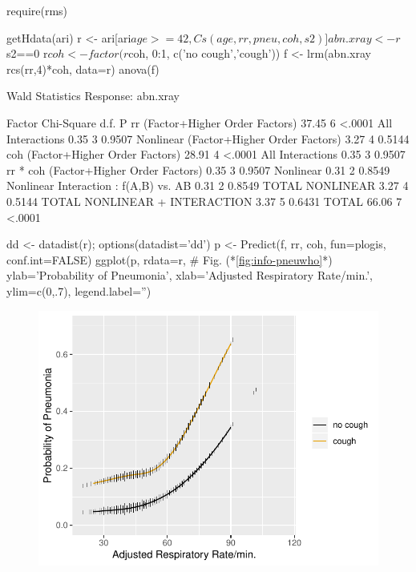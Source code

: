 \begin{Schunk}
\begin{Sinput}
require(rms)
\end{Sinput}
\begin{Sinput}
getHdata(ari)
r <- ari[ari$age >= 42, Cs(age, rr, pneu, coh, s2)]
abn.xray <- r$s2==0
r$coh <- factor(r$coh, 0:1, c('no cough','cough'))
f <- lrm(abn.xray ~ rcs(rr,4)*coh, data=r)
anova(f)
\end{Sinput}
\begin{Soutput}
                Wald Statistics          Response: abn.xray 

 Factor                                   Chi-Square d.f. P     
 rr  (Factor+Higher Order Factors)        37.45      6    <.0001
  All Interactions                         0.35      3    0.9507
  Nonlinear (Factor+Higher Order Factors)  3.27      4    0.5144
 coh  (Factor+Higher Order Factors)       28.91      4    <.0001
  All Interactions                         0.35      3    0.9507
 rr * coh  (Factor+Higher Order Factors)   0.35      3    0.9507
  Nonlinear                                0.31      2    0.8549
  Nonlinear Interaction : f(A,B) vs. AB    0.31      2    0.8549
 TOTAL NONLINEAR                           3.27      4    0.5144
 TOTAL NONLINEAR + INTERACTION             3.37      5    0.6431
 TOTAL                                    66.06      7    <.0001
\end{Soutput}
\begin{Sinput}
dd <- datadist(r); options(datadist='dd')
p <- Predict(f, rr, coh, fun=plogis, conf.int=FALSE)
ggplot(p, rdata=r,     # Fig. (*\ref{fig:info-pneuwho}*)
       ylab='Probability of Pneumonia',
       xlab='Adjusted Respiratory Rate/min.',
       ylim=c(0,.7), legend.label='')
\end{Sinput}
\begin{figure}[htbp]

\centerline{\includegraphics[width=\maxwidth]{info-pneuwho-1} }


\end{figure}
\end{Schunk}
